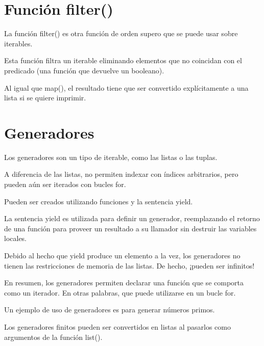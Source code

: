 \documentclass{report}
\begin{document}
{\section{Función filter()}

La función filter() es otra función de orden supero que se puede usar sobre iterables.

Esta función filtra un iterable eliminando elementos que no coincidan con el predicado (una función que devuelve un booleano).


Al igual que map(), el resultado tiene que ser convertido explícitamente a una lista si se quiere imprimir.

\section{Generadores}

Los generadores son un tipo de iterable, como las listas o las tuplas.

A diferencia de las listas, no permiten indexar con índices arbitrarios, pero pueden aún ser iterados con bucles for.

Pueden ser creados utilizando funciones y la sentencia yield.



La sentencia yield es utilizada para definir un generador, reemplazando el retorno de una función para proveer un resultado a su llamador sin destruir las variables locales.

Debido al hecho que yield produce un elemento a la vez, los generadores no tienen las restricciones de memoria de las listas. De hecho, ¡pueden ser infinitos!


En resumen, los generadores permiten declarar una función que se comporta como un iterador. En otras palabras, que puede utilizarse en un bucle for.

Un ejemplo de uso de generadores es para generar números primos.


Los generadores finitos pueden ser convertidos en listas al pasarlos como argumentos de la función list().


}
\end{document}
